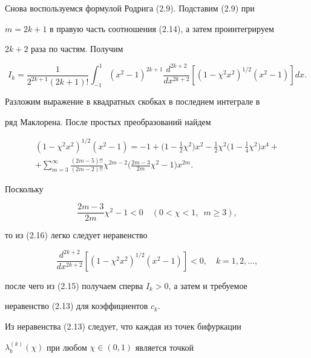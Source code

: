 Снова воспользуемся формулой Родрига (2.9). Подставим (2.9) при 


$m=2k+1$ в правую часть соотношения (2.14), а затем проинтегрируем 


$2k+2$ раза по частям. Получим 


\begin{equation} 


I_k=\frac{1}{2^{2k+1}(2k+1)!}\int^1_{-1}(x^2-1)^{2k+1} 


\frac{d^{2k+2}}{dx^{2k+2}}[(1-\chi^2x^2)^{1/2}(x^2-1)]dx.\tag{2.15} 


\end{equation} 


Разложим выражение в квадратных скобках в последнем интеграле в  


ряд Маклорена. После простых преобразований найдем 


\begin{multline} 


(1-\chi^2x^2)^{1/2}(x^2-1)=-1+\big(1-\tfrac{1}{2}\chi^2\big)x^2- 


\tfrac{1}{2}\chi^2\big(1-\tfrac{1}{4}\chi^2\big)x^4+ \\


+\sum^\infty_{m=3}\frac{(2m-5)!!}{(2m-2)!!}\chi^{2m-2} 


\bigg(\frac{2m-3}{2m}\chi^2-1\bigg)x^{2m}.\tag{2.16} 


\end{multline} 


Поскольку 


$$ 


\frac{2m-3}{2m}\chi^2-1<0\quad (0<\chi<1,\ \; m\ge 3), 


$$ 


то из (2.16) легко следует неравенство  


$$ 


\frac{d^{2k+2}}{dx^{2k+2}}[(1-\chi^2x^2)^{1/2}(x^2-1)]<0, 


\quad k=1,2,\dotsc, 


$$ 


после чего из (2.15) получаем сперва $I_k>0$, а затем и требуемое 


неравенство (2.13) для коэффициентов $c_k$. 


 


Из неравенства (2.13) следует, что каждая из точек бифуркации 


$\lambda^{(k)}_b(\chi)$ при любом $\chi\in(0,1)$ является точкой 


